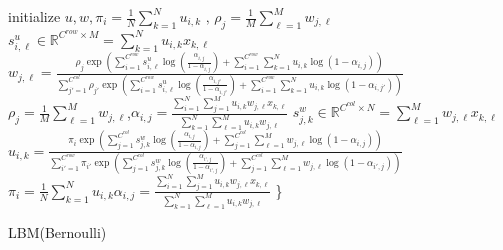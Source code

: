 \documentclass[fleqn,dvipdfmx,10pt]{beamer}
\begin{document}
\begin{frame}
  \begin{algorithm}[H]
    \begin{algorithmic}[1]
      \STATE initialize $u,w,\pi_i=\frac{1}{N}\sum_{k=1}^Nu_{i,k}\text{ , }\rho_j=\frac{1}{M}\sum_{\ell=1}^Mw_{j,\ell}$
      \REPEAT
      \STATE $s^{u}_{i,\ell}\in\mathbb{R}^{C^{row}\times M}=\sum_{k=1}^N u_{i,k} x_{k,\ell}$
      \REPEAT
      \STATE $w_{j,\ell}=\frac{\rho_j\exp\left(\sum_{i=1}^{C^{row}} s^{u}_{i,\ell}\log(\frac{\alpha_{i,j}}{1-\alpha_{i,j}})
        +\sum_{i=1}^{C^{row}}\sum_{k=1}^N u_{i,k}\log(1-\alpha_{i,j})\right)}
             {\sum_{j'=1}^{C^{col}} \rho_{j'}\exp\left(\sum_{i=1}^{C^{row}}s^{u}_{i,\ell}
               \log(\frac{\alpha_{i,j'}}{1-\alpha_{i,j'}})
               +\sum_{i=1}^{C^{row}}\sum_{k=1}^N u_{i,k}\log(1-\alpha_{i,j'})\right)}$
             \STATE $\rho_j=\frac{1}{M}\sum_{\ell=1}^Mw_{j,\ell}$,\text{ , }$\alpha_{i,j}=\frac{\sum_{i=1}^N\sum_{j=1}^Mu_{i,k}w_{j,\ell}x_{k,\ell}}{\sum_{k=1}^N\sum_{\ell=1}^Mu_{i,k}w_{j,\ell}}$
             \STATE $s^{w}_{j,k}\in\mathbb{R}^{C^{col}\times N}=\sum_{\ell=1}^M w_{j,\ell} x_{k,\ell}$
             \REPEAT
             \STATE $u_{i,k}=\frac{\pi_i\exp\left(\sum_{j=1}^{C^{col}}s^{w}_{j,k}
               \log(\frac{\alpha_{i,j}}{1-\alpha_{i,j}})
               +\sum_{j=1}^{C^{col}}\sum_{\ell=1}^M w_{j,\ell}\log(1-\alpha_{i,j})\right)}
                    {\sum_{i'=1}^{C^{row}} \pi_{i'}\exp\left(\sum_{j=1}^{C^{col}}s^{w}_{j,k}
                      \log(\frac{\alpha_{i',j}}{1-\alpha_{i',j}})
                      +\sum_{j=1}^{C^{col}}\sum_{\ell=1}^M w_{j,\ell}\log(1-\alpha_{i',j})\right)}$
                    \STATE $\pi_i=\frac{1}{N}\sum_{k=1}^Nu_{i,k}$\text{ , }$\alpha_{i,j}=\frac{\sum_{i=1}^N\sum_{j=1}^Mu_{i,k}w_{j,\ell}x_{k,\ell}}{\sum_{k=1}^N\sum_{\ell=1}^Mu_{i,k}w_{j,\ell}}$
                    \}
    \end{algorithmic}
    \caption{LBM(Bernoulli)}
  \end{algorithm}
\end{frame}
\end{document}
